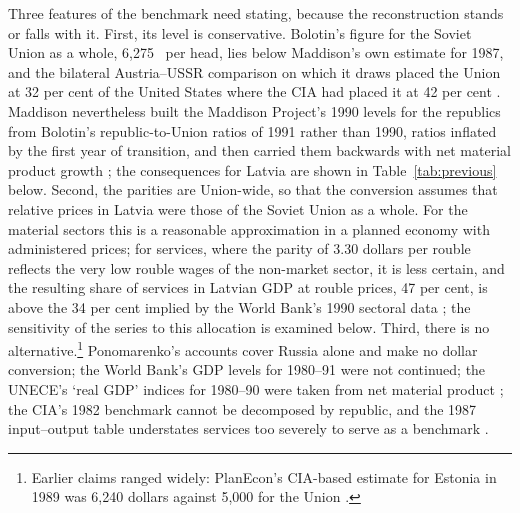 

Three features of the benchmark need stating, because the reconstruction stands or falls with it. First, its level is conservative. Bolotin's figure for the Soviet Union as a whole, 6,275~\intlnineteen{} per head, lies below Maddison's own estimate for 1987, and the bilateral Austria--USSR comparison on which it draws placed the Union at 32 per cent of the United States where the CIA had placed it at 42 per cent \parencite[318--19]{Maddison1998b}. Maddison nevertheless built the Maddison Project's 1990 levels for the republics from Bolotin's republic-to-Union ratios of 1991 rather than 1990, ratios inflated by the first year of transition, and then carried them backwards with net material product growth \parencite[181--2]{maddisonworldeconomy}; the consequences for Latvia are shown in Table~\ref{tab:previous} below. Second, the parities are Union-wide, so that the conversion assumes that relative prices in Latvia were those of the Soviet Union as a whole. For the material sectors this is a reasonable approximation in a planned economy with administered prices; for services, where the parity of 3.30 dollars per rouble reflects the very low rouble wages of the non-market sector, it is less certain, and the resulting share of services in Latvian GDP at rouble prices, 47 per cent, is above the 34 per cent implied by the World Bank's 1990 sectoral data \parencite{wbstatisticalhandbook1994}; the sensitivity of the series to this allocation is examined below. Third, there is no alternative.\footnote{Earlier claims ranged widely: PlanEcon's CIA-based estimate for Estonia in 1989 was 6,240 dollars against 5,000 for the Union \parencite[166]{kukk2005}.} Ponomarenko's accounts cover Russia alone and make no dollar conversion; the World Bank's GDP levels for 1980--91 \parencites{wbtransitionlatv}[32--3]{worldtables1995} were not continued; the UNECE's `real GDP' indices for 1980--90 were taken from net material product \parencite[249]{UNECE1995}; the CIA's 1982 benchmark cannot be decomposed by republic, and the 1987 input--output table understates services too severely to serve as a benchmark \parencite{wbinputoutput1987}.

